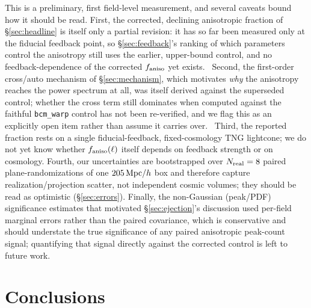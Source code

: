 \documentclass[11pt]{article}
\newcommand{\faniso}{f_{\rm aniso}}
\begin{document}
This is a preliminary, first field-level measurement, and several
caveats bound how it should be read. First, the corrected, declining
anisotropic fraction of \S\ref{sec:headline} is itself only a partial
revision: it has so far been measured only at the fiducial feedback
point, so \S\ref{sec:feedback}'s ranking of which parameters control the
anisotropy still uses the earlier, upper-bound control, and no
feedback-dependence of the corrected $\faniso$ yet exists.\ %
Second, the first-order cross/auto mechanism of \S\ref{sec:mechanism},
which motivates \emph{why} the anisotropy reaches the power spectrum at
all, was itself derived against the superseded control; whether the
cross term still dominates when computed against the faithful
\texttt{bcm\_warp} control has not been re-verified, and we flag this as
an explicitly open item rather than assume it carries over.\ %
Third, the reported fraction rests on a single fiducial-feedback,
fixed-cosmology TNG lightcone; we do not yet know whether $\faniso(\ell)$
itself depends on feedback strength or on cosmology. Fourth, our
uncertainties are bootstrapped over $N_{\rm real}=8$ paired
plane-randomizations of one $205\,{\rm Mpc}/h$ box and therefore capture
realization/projection scatter, not independent cosmic volumes; they
should be read as optimistic (\S\ref{sec:errors}). Finally, the
non-Gaussian (peak/PDF) significance estimates that motivated
\S\ref{sec:ejection}'s discussion used per-field marginal errors rather
than the paired covariance, which is conservative and should understate
the true significance of any paired anisotropic peak-count signal;
quantifying that signal directly against the corrected control is left
to future work.

\section{Conclusions}\label{sec:conclusions}
\end{document}
